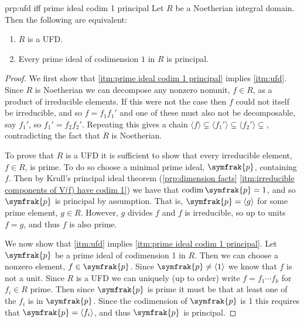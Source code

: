 \documentclass[fleqn]{NotesClass}
\newcommand{\ideal}[1]{\symfrak{#1}}
\DeclareMathOperator{\codim}{codim}
\begin{document}
    \begin{prp}{}{prp:ufd iff prime ideal codim 1 principal}
        Let \(R\) be a Noetherian integral domain.
        Then the following are equivalent:
        \begin{enumerate}
            \item \label{itm:ufd}\(R\) is a UFD.
            \item \label{itm:prime ideal codim 1 principal}Every prime ideal of codimension \(1\) in \(R\) is principal.
        \end{enumerate}
        \begin{proof}
            We first show that \cref{itm:prime ideal codim 1 principal} implies \cref{itm:ufd}.
            Since \(R\) is Noetherian we can decompose any nonzero nonunit, \(f \in R\), as a product of irreducible elements.
            If this were not the case then \(f\) could not itself be irreducible, and so \(f = f_1 f_1'\) and one of these must also not be decomposable, say \(f_1'\), so \(f_1' = f_2f_2'\).
            Repeating this gives a chain \(\langle f \rangle \subsetneq \langle f_1' \rangle \subsetneq \langle f_2' \rangle \subsetneq\), contradicting the fact that \(R\) is Noetherian.
            
            To prove that \(R\) is a UFD it is sufficient to show that every irreducible element, \(f \in R\), is prime.
            To do so choose a minimal prime ideal, \(\ideal{p}\), containing \(f\).
            Then by Krull's principal ideal theorem (\cref{prp:dimension facts} \cref{itm:irreducible components of V(f) have codim 1}) we have that \(\codim \ideal{p} = 1\), and so \(\ideal{p}\) is principal by assumption.
            That is, \(\ideal{p} = \langle g \rangle\) for some prime element, \(g \in R\).
            However, \(g\) divides \(f\) and \(f\) is irreducible, so up to units \(f = g\), and thus \(f\) is also prime.
            
            We now show that \cref{itm:ufd} implies \cref{itm:prime ideal codim 1 principal}.
            Let \(\ideal{p}\) be a prime ideal of codimension 1 in \(R\).
            Then we can choose a nonzero element, \(f \in \ideal{p}\).
            Since \(\ideal{p} \ne \langle 1 \rangle\) we know that \(f\) is not a unit.
            Since \(R\) is a UFD we can uniquely (up to order) write \(f = f_1 \dotsm f_k\) for \(f_i \in R\) prime.
            Then since \(\ideal{p}\) is prime it must be that at least one of the \(f_i\) is in \(\ideal{p}\).
            Since the codimension of \(\ideal{p}\) is 1 this requires that \(\ideal{p} = \langle f_i \rangle\), and thus \(\ideal{p}\) is principal.
        \end{proof}
    \end{prp}
    
\end{document}
